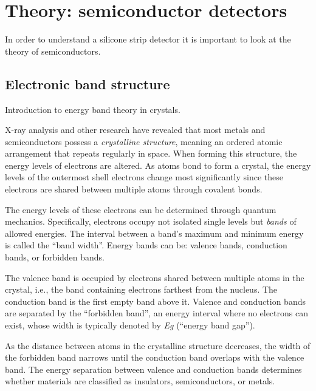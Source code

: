 \chapter{Theory: semiconductor detectors}\label{chap:01}
In order to understand a silicone strip detector it is important to look at the theory of semiconductors.
\section{Electronic band structure}
Introduction to energy band theory in crystals.

X-ray analysis and other research have revealed that most metals and semiconductors possess a \emph{crystalline structure}, meaning an ordered atomic arrangement that repeats regularly in space. When forming this structure, the energy levels of electrons are altered. As atoms bond to form a crystal, the energy levels of the outermost shell electrons change most significantly since these electrons are shared between multiple atoms through covalent bonds.

The energy levels of these electrons can be determined through quantum mechanics. Specifically, electrons occupy not isolated single levels but \emph{bands} of allowed energies. The interval between a band's maximum and minimum energy is called the \enquote{band width}. Energy bands can be: valence bands, conduction bands, or forbidden bands.

The valence band is occupied by electrons shared between multiple atoms in the crystal, i.e., the band containing electrons farthest from the nucleus. The conduction band is the first empty band above it. Valence and conduction bands are separated by the \enquote{forbidden band}, an energy interval where no electrons can exist, whose width is typically denoted by \emph{Eg} (\enquote{energy band gap}).

As the distance between atoms in the crystalline structure decreases, the width of the forbidden band narrows until the conduction band overlaps with the valence band.  
The energy separation between valence and conduction bands determines whether materials are classified as insulators, semiconductors, or metals.

